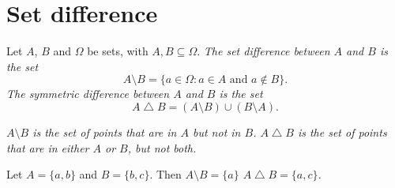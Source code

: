 \section{Set difference}
\begin{definition}
Let $A$, $B$ and $\Omega$ be sets, with $A,B\subseteq \Omega$.
\ben
\it The \emph{set difference} between $A$ and $B$ is the set
$$
A\setminus B = \{a\in \Omega : a\in A \text{ and } a\notin B\}. %
$$
\it The \emph{symmetric difference} between $A$ and $B$ is the set 
$$
A\bigtriangleup B = (A\setminus B) \cup (B\setminus A). %
$$
\een
\end{definition}

\bit
\it $A\setminus B$ is the set of points that are in $A$ but not in $B$.
\it $A\bigtriangleup B$ is the set of points that are in either $A$ or $B$, but not both.
\eit

\begin{example}
Let $A=\{a,b\}$ and $B=\{b,c\}$. Then
\bit
\it $A\setminus B = \{a\}$
\it $A\bigtriangleup B = \{a,c\}$.
\eit
\end{example}

\break %



